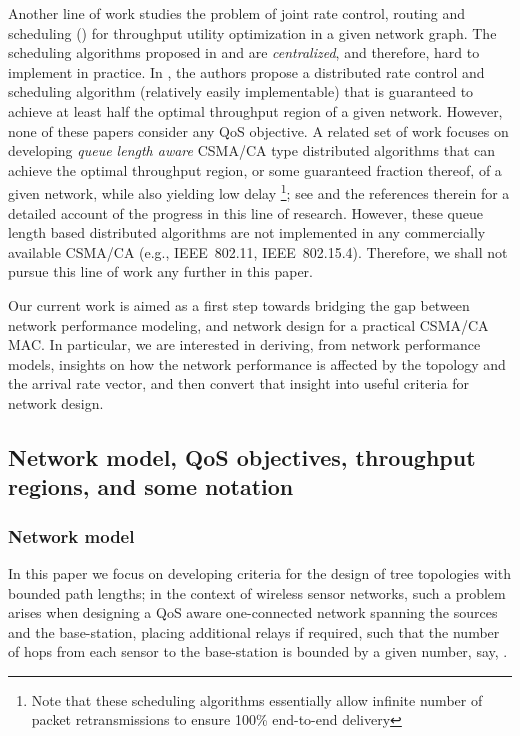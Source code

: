 \documentclass[12pt, draftclsnofoot, onecolumn]{IEEEtran}
\begin{document}
Another line of work studies the problem of joint rate control, routing and scheduling (\cite{jain-etal03interference, lin-shroff04rate-control, lin-shroff06imperfect-scheduling}) for throughput utility optimization in a given network graph. The scheduling algorithms proposed in \cite{jain-etal03interference} and \cite{lin-shroff04rate-control} are \emph{centralized}, and therefore, hard to implement in practice. In \cite{lin-shroff06imperfect-scheduling}, the authors propose a distributed rate control and scheduling algorithm (relatively easily implementable) that is guaranteed to achieve at least half the optimal throughput region of a given network. However, none of these papers consider any QoS objective. A related set of work focuses on developing \emph{queue length aware} CSMA/CA type distributed algorithms that can achieve the optimal throughput region, or some guaranteed fraction thereof, of a given network, while also yielding low delay \footnote{Note that these scheduling algorithms essentially allow infinite number of packet retransmissions to ensure 100\% end-to-end delivery}; see \cite{jiang-walrand12delay-distributed-scheduling} and the references therein for a detailed account of the progress in this line of research. However, these queue length based distributed algorithms are not implemented in any commercially available CSMA/CA (e.g., IEEE~802.11, IEEE~802.15.4). Therefore, we shall not pursue this line of work any further in this paper. 

Our current work is aimed as a first step towards bridging the gap between network performance modeling, and network design for a practical CSMA/CA MAC. In particular, we are interested in deriving, from network performance models, insights on how the network performance is affected by the topology and the arrival rate vector, and then convert that insight into useful criteria for network design. 

\subsection{Network model, QoS objectives, throughput regions, and some notation}
\label{subsec:nw-model-throuput-notation}
\subsubsection{Network model}
\label{subsubsec:setting}
In this paper we focus on developing criteria for the design of tree topologies with bounded path lengths; in the context of wireless sensor networks, such a problem arises when designing a QoS aware one-connected network spanning the sources and the base-station, placing additional relays if required, such that the number of hops from each sensor to the base-station is bounded by a given number, say, . 
 
\end{document}
